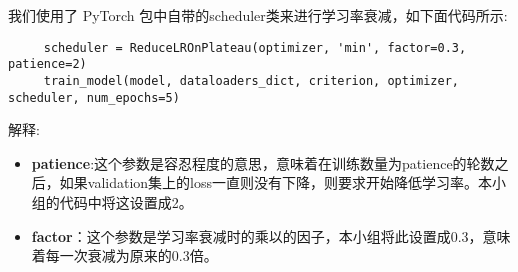     我们使用了 PyTorch 包中自带的scheduler类来进行学习率衰减，如下面代码所示:
    \begin{lstlisting}
     scheduler = ReduceLROnPlateau(optimizer, 'min', factor=0.3, patience=2)
     train_model(model, dataloaders_dict, criterion, optimizer, scheduler, num_epochs=5)
    \end{lstlisting}
    解释:
    \begin{itemize}
        \item \textbf{patience}:这个参数是容忍程度的意思，意味着在训练数量为patience的轮数之后，如果validation集上的loss一直则没有下降，则要求开始降低学习率。本小组的代码中将这设置成2。
        \item \textbf{factor}：这个参数是学习率衰减时的乘以的因子，本小组将此设置成0.3，意味着每一次衰减为原来的0.3倍。
    \end{itemize}

